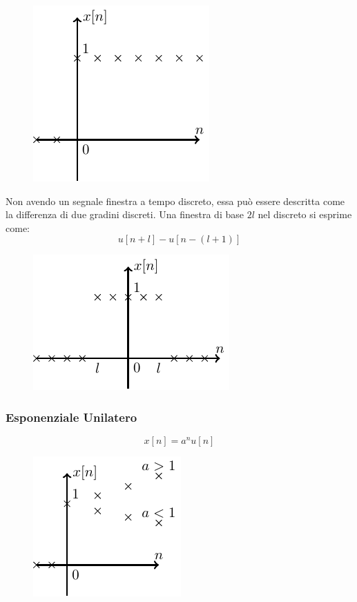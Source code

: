 \documentclass{article}
\numberwithin{equation}{subsection}
\begin{document}
\begin{figure}[H]%
    \centering
    \includegraphics{gradino-discreto.pdf}%
\end{figure}

Non avendo un segnale finestra a tempo discreto, essa può essere descritta come la differenza di due gradini discreti. Una finestra di base $2l$ nel discreto si esprime come:
\begin{equation*}
    u[n+l]-u[n-(l+1)]
\end{equation*}

\begin{figure}[H]%
    \centering
    \includegraphics{finestra-discreto.pdf}%
\end{figure}

\subsubsection{Esponenziale Unilatero}

\begin{equation}
    x[n]=a^nu[n]
\end{equation}

\begin{figure}[H]%
    \centering
    \includegraphics{esponenziale-unilatero-discreto.pdf}%
\end{figure}
\end{document}
